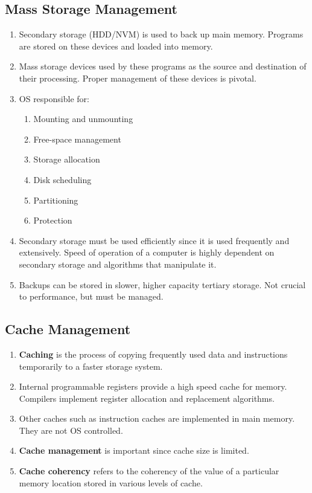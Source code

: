 \documentclass[journal,12pt,twocolumn]{IEEEtran}
\begin{document}
\subsection{Mass Storage Management}
\begin{enumerate}
    \item Secondary storage (HDD/NVM) is used to back up main memory. Programs 
    are stored on these devices and loaded into memory.
    \item Mass storage devices used by these programs as the source and 
    destination of their processing. Proper management of these devices is 
    pivotal.
    \item OS responsible for:
    \begin{enumerate}
        \item Mounting and unmounting
        \item Free-space management
        \item Storage allocation
        \item Disk scheduling
        \item Partitioning
        \item Protection
    \end{enumerate}
    \item Secondary storage must be used efficiently since it is used 
    frequently and extensively. Speed of operation of a computer is highly 
    dependent on secondary storage and algorithms that manipulate it.
    \item Backups can be stored in slower, higher capacity tertiary storage. 
    Not crucial to performance, but must be managed.
\end{enumerate}

\subsection{Cache Management}
\begin{enumerate}
    \item \textbf{Caching} is the process of copying frequently used data and 
    instructions temporarily to a faster storage system.
    \item Internal programmable registers provide a high speed cache for memory.
    Compilers implement register allocation and replacement algorithms.
    \item Other caches such as instruction caches are implemented in main
    memory. They are not OS controlled.
    \item \textbf{Cache management} is important since cache size is limited.
    \item \textbf{Cache coherency} refers to the coherency of the value of a 
    particular memory location stored in various levels of cache.
\end{enumerate}
\end{document}
